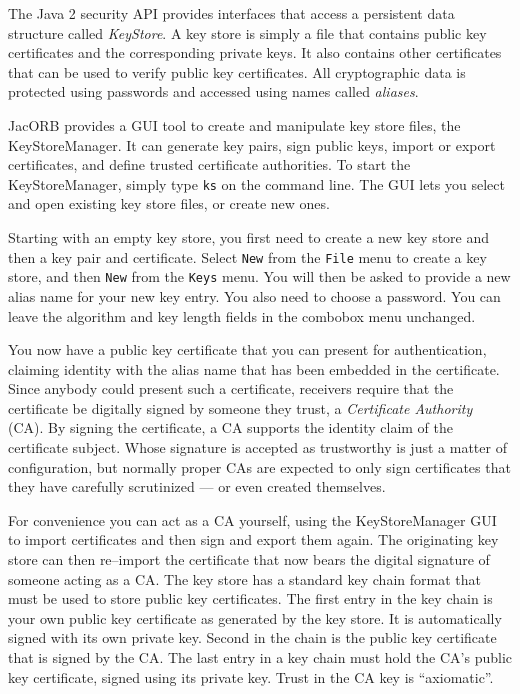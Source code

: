 \documentclass[12pt]{scrbook}
\begin{document}
The Java 2  security API provides interfaces that  access a persistent
data structure  called {\em  KeyStore}. A key  store is simply  a file
that contains  public key  certificates and the  corresponding private
keys. It also  contains other certificates that can  be used to verify
public key  certificates.  All  cryptographic data is  protected using
passwords and accessed using names called {\em aliases}.

JacORB provides a  GUI tool to create and  manipulate key store files,
the  KeyStoreManager. It  can generate  key pairs,  sign  public keys,
import  or   export  certificates,  and   define  trusted  certificate
authorities. To start the KeyStoreManager, simply type {\tt ks} on the
command  line. The GUI  lets you  select and  open existing  key store
files, or create new ones.

Starting with an  empty key store, you first need to  create a new key
store and then  a key pair and certificate. Select  {\tt New} from the
{\tt File}  menu to create  a key store,  and then {\tt New}  from the
{\tt Keys} menu.   You will then be asked to provide  a new alias name
for your  new key entry. You also  need to choose a  password. You can
leave  the  algorithm  and  key  length fields  in  the  combobox  menu
unchanged.

\bigskip
\centerline{}

You  now  have a  public  key certificate  that  you  can present  for
authentication, claiming  identity with the  alias name that  has been
embedded  in the  certificate.   Since anybody  could  present such  a
certificate,  receivers  require  that  the certificate  be  digitally
signed by someone  they trust, a {\em Certificate  Authority} (CA). By
signing  the certificate,  a CA  supports  the identity  claim of  the
certificate  subject. Whose  signature is  accepted as  trustworthy is
just a matter  of configuration, but normally proper  CAs are expected
to only sign certificates that  they have carefully scrutinized --- or
even created themselves. 

\bigskip
\centerline{}

For   convenience  you   can  act   as  a   CA  yourself,   using  the
KeyStoreManager GUI  to import certificates  and then sign  and export
them  again.   The  originating  key  store can  then  re--import  the
certificate that now bears the  digital signature of someone acting as
a CA. The key store has a  standard key chain format that must be used
to store public key certificates. The  first entry in the key chain is
your own public  key certificate as generated by the  key store. It is
automatically signed with its own  private key. Second in the chain is
the public key certificate that is signed by the CA. The last entry in
a key  chain must hold the  CA's public key  certificate, signed using
its private key. Trust in the CA key is ``axiomatic''. 
\end{document}
